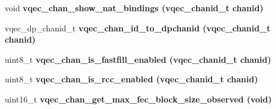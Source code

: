 \begin{CompactItemize}
\item 
void \bf{vqec\_\-chan\_\-show\_\-nat\_\-bindings} (\bf{vqec\_\-chanid\_\-t} chanid)
\item 
vqec\_\-dp\_\-chanid\_\-t \bf{vqec\_\-chan\_\-id\_\-to\_\-dpchanid} (\bf{vqec\_\-chanid\_\-t} chanid)
\item 
uint8\_\-t \bf{vqec\_\-chan\_\-is\_\-fastfill\_\-enabled} (\bf{vqec\_\-chanid\_\-t} chanid)
\item 
uint8\_\-t \bf{vqec\_\-chan\_\-is\_\-rcc\_\-enabled} (\bf{vqec\_\-chanid\_\-t} chanid)
\item 
uint16\_\-t \bf{vqec\_\-chan\_\-get\_\-max\_\-fec\_\-block\_\-size\_\-observed} (void)
\end{CompactItemize}
